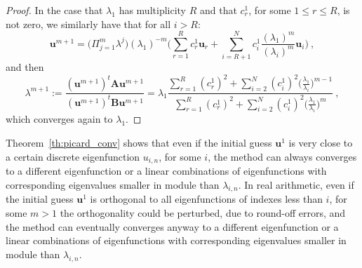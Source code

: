 \documentclass[preprint,12pt]{elsarticle}
\begin{document}
\begin{proof}

In the case that $\lambda_1$ has multiplicity $R$ and that $c_r^1$, for some $1\leq r\leq R$, is not zero,
we similarly have that for all $i>R$:
$$
\mathbf{u}^{m+1}=\Big(\Pi_{j=1}^m\lambda^{j}\Big)(\lambda_1)^{-m}\Big( \sum_{r=1}^Rc_r^1 \mathbf{u}_r+
\sum_{i=R+1}^N c_i^1\frac{(\lambda_1)^m}{(\lambda_i)^{m}}\mathbf{u}_i\Big) \ ,
$$
and then
$$
\lambda^{m+1}:=\frac{(\mathbf{u}^{m+1})^t\mathbf{A}\mathbf{u}^{m+1}}{(\mathbf{u}^{m+1})^t\mathbf{B}\mathbf{u}^{m+1}}
=\lambda_1 \frac{\displaystyle \sum_{r=1}^R(c_r^1)^2 +
\sum_{i=2}^N (c_i^1)^2\Bigg(\frac{\lambda_1}{\lambda_i}\Bigg)^{m-1}}
{\displaystyle \sum_{r=1}^R(c_r^1)^2 +
\sum_{i=2}^N (c_i^1)^2\Bigg(\frac{\lambda_1}{\lambda_i}\Bigg)^{m}}\ ,
$$
which converges again to $\lambda_1$.


\end{proof}

Theorem~\ref{th:picard_conv} shows that even if the initial guess $\mathbf{u}^1$ is very close to a certain discrete eigenfunction $u_{i,n}$, for some $i$, the method can always converges to a different eigenfunction or a linear combinations of eigenfunctions with corresponding eigenvalues smaller in module than $\lambda_{i,n}$. In real arithmetic, even if the initial guess $\mathbf{u}^1$ is orthogonal to all eigenfunctions of indexes less than $i$, for some $m>1$ the orthogonality could be perturbed, due to round-off errors, and the method can eventually converges anyway to a different eigenfunction or a linear combinations of eigenfunctions with corresponding eigenvalues smaller in module than $\lambda_{i,n}$.
%
\end{document}
